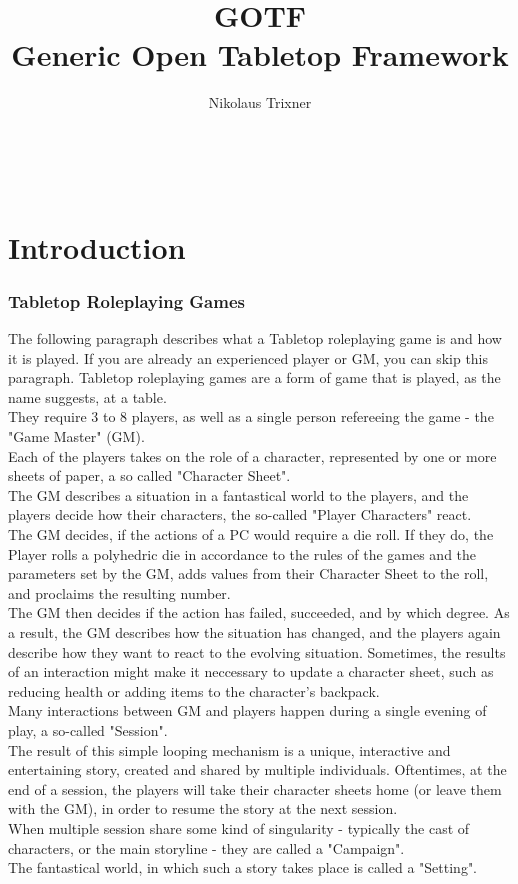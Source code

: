 \documentclass{article}
\begin{document}
	\title{GOTF \\ Generic Open Tabletop Framework}
	\
	\author{Nikolaus Trixner}
		
	\maketitle
	
	\tableofcontents

\part{Introduction}\label{part:intrudction}
\section{Tabletop Roleplaying Games}\label{sec:ttrpgs}
	The following paragraph describes what a Tabletop roleplaying game is and how it is played.
	If you are already an experienced player or GM, you can skip this paragraph.
	Tabletop roleplaying games are a form of game that is played, as the name suggests, at a table.\\
	They require 3 to 8 players, as well as a single person refereeing the game - the "Game Master" (GM).\\
	Each of the players takes on the role of a character, represented by one or more sheets of paper, a so called "Character Sheet".\\
	The GM describes a situation in a fantastical world to the players, and the players decide how their characters, the so-called "Player Characters" react.\\
	The GM decides, if the actions of a PC would require a die roll.
	If they do, the Player rolls a polyhedric die in accordance to the rules of the games and the parameters set by the GM, adds values from their Character Sheet to the roll, and proclaims the resulting number.\\
	The GM then decides if the action has failed, succeeded, and by which degree.
	As a result, the GM describes how the situation has changed, and the players again describe how they want to react to the evolving situation.
	Sometimes, the results of an interaction might make it neccessary to update a character sheet, such as reducing health or adding items to the character's backpack.\\
	Many interactions between GM and players happen during a single evening of play, a so-called "Session".\\
	The result of this simple looping mechanism is a unique, interactive and entertaining story, created and shared by multiple individuals.
	Oftentimes, at the end of a session, the players will take their character sheets home (or leave them with the GM), in order to resume the story at the next session.\\
	When multiple session share some kind of singularity - typically the cast of characters, or the main storyline - they are called a "Campaign".\\
	The fantastical world, in which such a story takes place is called a "Setting".
\end{document}
